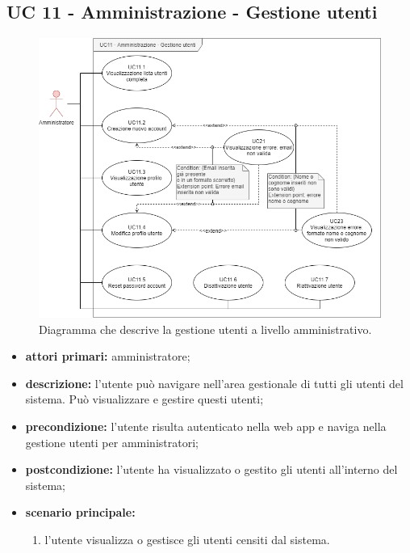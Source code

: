 \subsection{UC 11 - Amministrazione - Gestione utenti}

		\begin{figure}[H]
			\centering
			\includegraphics[scale=0.60]{res/images/uc11}
			\caption{Diagramma che descrive la gestione utenti a livello amministrativo.}
		\end{figure}

		\begin{itemize}
			\item \textbf{attori primari:} amministratore;
			\item \textbf{descrizione:} l'utente può navigare nell'area gestionale di tutti gli utenti del sistema. Può visualizzare e gestire questi utenti;
			\item \textbf{precondizione:} l'utente risulta autenticato nella web app e naviga nella gestione utenti per amministratori;
			\item \textbf{postcondizione:} l'utente ha visualizzato o gestito gli utenti all'interno del sistema;
			\item \textbf{scenario principale:}
			\begin{enumerate}
				\item{l'utente visualizza o gestisce gli utenti censiti dal sistema.}
			\end{enumerate}
		\end{itemize}

